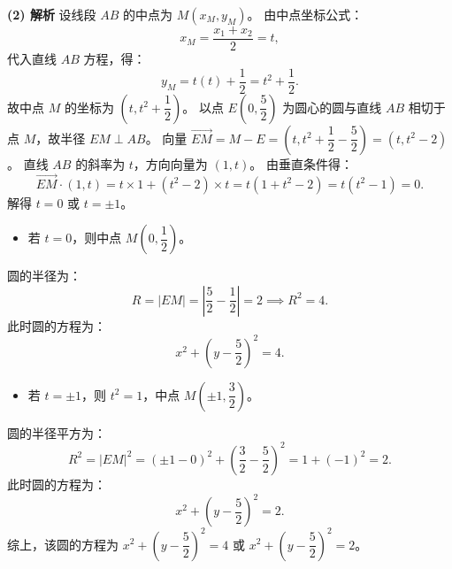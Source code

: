 \begin{answer}
\textbf{(2) 解析}
设线段 $AB$ 的中点为 $M(x_M, y_M)$。
由中点坐标公式：
\nopagebreak[4]
\[x_M = \frac{x_1 + x_2}{2} = t,\]
代入直线 $AB$ 方程，得：
\nopagebreak[4]
\[y_M = t(t) + \frac{1}{2} = t^2 + \frac{1}{2}.\]
故中点 $M$ 的坐标为 $\left(t, t^2 + \dfrac{1}{2}\right)$。
以点 $E\left(0, \dfrac{5}{2}\right)$ 为圆心的圆与直线 $AB$ 相切于点 $M$，故半径 $EM \perp AB$。
向量 $\vec{EM} = M - E = \left(t, t^2 + \dfrac{1}{2} - \dfrac{5}{2}\right) = (t, t^2 - 2)$。
直线 $AB$ 的斜率为 $t$，方向向量为 $(1, t)$。
由垂直条件得：
\nopagebreak[4]
\[\vec{EM} \cdot (1, t) = t \times 1 + (t^2 - 2) \times t = t(1 + t^2 - 2) = t(t^2 - 1) = 0.\]
解得 $t = 0$ 或 $t = \pm 1$。
\begin{itemize}
\item 若 $t = 0$，则中点 $M\left(0, \dfrac{1}{2}\right)$。
\end{itemize}
  圆的半径为：
\nopagebreak[4]
\[R = |EM| = \left|\frac{5}{2} - \frac{1}{2}\right| = 2 \implies R^2 = 4.\]
  此时圆的方程为：
\nopagebreak[4]
\[x^2 + \left(y - \frac{5}{2}\right)^2 = 4.\]
\begin{itemize}
\item 若 $t = \pm 1$，则 $t^2 = 1$，中点 $M\left(\pm 1, \dfrac{3}{2}\right)$。
\end{itemize}
  圆的半径平方为：
\nopagebreak[4]
\[R^2 = |EM|^2 = (\pm 1 - 0)^2 + \left(\frac{3}{2} - \frac{5}{2}\right)^2 = 1 + (-1)^2 = 2.\]
  此时圆的方程为：
\nopagebreak[4]
\[x^2 + \left(y - \frac{5}{2}\right)^2 = 2.\]
综上，该圆的方程为 $x^2 + \left(y - \dfrac{5}{2}\right)^2 = 4$ 或 $x^2 + \left(y - \dfrac{5}{2}\right)^2 = 2$。



\par\medskip

\end{answer}
